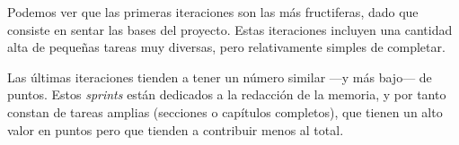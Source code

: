
Podemos ver que las primeras iteraciones son las más fructiferas, dado que consiste en sentar las bases del proyecto.
Estas iteraciones incluyen una cantidad alta de pequeñas tareas muy diversas, pero relativamente simples de completar.

Las últimas iteraciones tienden a tener un número similar ---y más bajo--- de puntos.
Estos \emph{sprints} están dedicados a la redacción de la memoria, y por tanto constan de tareas amplias (secciones o capítulos completos), que tienen un alto valor en puntos pero que tienden a contribuir menos al total.